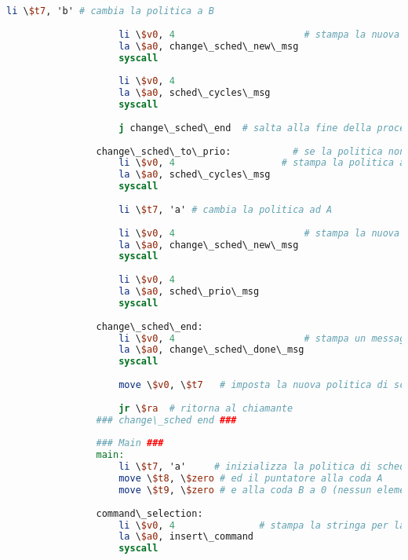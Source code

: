 \begin{center}
\begin{lstlisting}[language=mips, gobble=14, stepnumber=1]
                    li \$t7, 'b' # cambia la politica a B
                    
                    li \$v0, 4                       # stampa la nuova politica (su ESECUZIONI RIMANENTI)
                    la \$a0, change\_sched\_new\_msg
                    syscall
                    
                    li \$v0, 4
                    la \$a0, sched\_cycles\_msg
                    syscall
                    
                    j change\_sched\_end  # salta alla fine della procedura
                    
                change\_sched\_to\_prio:           # se la politica non era A
                    li \$v0, 4                   # stampa la politica attuale (su ESECUZIONI RIMANENTI)
                    la \$a0, sched\_cycles\_msg
                    syscall
                
                    li \$t7, 'a' # cambia la politica ad A
                    
                    li \$v0, 4                       # stampa la nuova politica (su PRIORITA)
                    la \$a0, change\_sched\_new\_msg
                    syscall
                    
                    li \$v0, 4
                    la \$a0, sched\_prio\_msg
                    syscall
                    
                change\_sched\_end:
                    li \$v0, 4                       # stampa un messaggio di corretta terminazione della procedura
                    la \$a0, change\_sched\_done\_msg
                    syscall
                    
                    move \$v0, \$t7   # imposta la nuova politica di scheduling come valore di ritorno
                    
                    jr \$ra  # ritorna al chiamante
                ### change\_sched end ###
                
                ### Main ###
                main:
                    li \$t7, 'a'     # inizializza la politica di scheduling ad A (scheduling su priorità)
                    move \$t8, \$zero # ed il puntatore alla coda A
                    move \$t9, \$zero # e alla coda B a 0 (nessun elemento in coda)
                
                command\_selection:
                    li \$v0, 4               # stampa la stringa per la selezione del comando
                    la \$a0, insert\_command
                    syscall
                    

\end{lstlisting}
\end{center}
